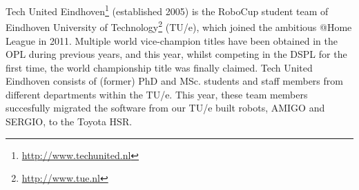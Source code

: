 Tech United Eindhoven\footnote{\url{http://www.techunited.nl}} (established 2005) is the RoboCup student team of Eindhoven University of Technology\footnote{\url{http://www.tue.nl}} (TU/e), which joined the ambitious @Home League in 2011. 
Multiple world vice-champion titles have been obtained in the OPL during previous years, and this year, whilst competing in the DSPL for the first time, the world championship title was finally claimed.
Tech United Eindhoven consists of (former) PhD and MSc. students and staff members from different departments within the TU/e. 
This year, these team members succesfully migrated the software from our TU/e built robots, AMIGO and SERGIO, to the Toyota HSR. 
 


